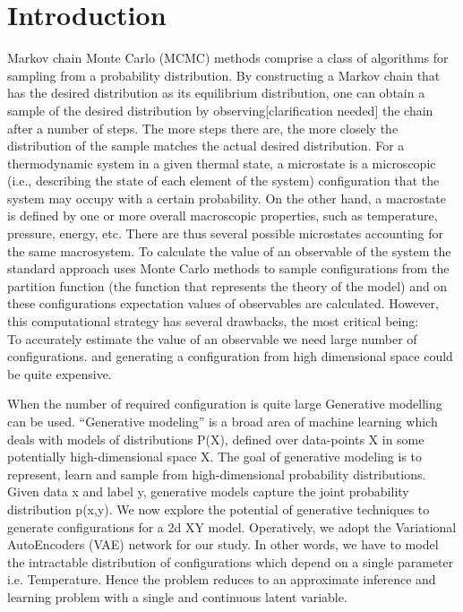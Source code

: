 \documentclass[12pt,a4paper]{article}
\begin{document}
{
\section{Introduction}
Markov chain Monte Carlo (MCMC) methods comprise a class of algorithms for sampling from a probability distribution. By constructing a Markov chain that has the desired distribution as its equilibrium distribution, one can obtain a sample of the desired distribution by observing[clarification needed] the chain after a number of steps. The more steps there are, the more closely the distribution of the sample matches the actual desired distribution. For a thermodynamic system in a given thermal state, a microstate is a microscopic (i.e., describing the state of each element of the system) configuration that the system may occupy with a certain probability. On the other hand, a macrostate is defined by one or more overall macroscopic properties, such as temperature, pressure, energy, etc. There are thus several possible microstates accounting for the same macrosystem. To calculate the value of an observable of the system the standard approach uses Monte Carlo methods to sample configurations from the partition function (the function that represents the theory of the model) and on these configurations expectation values of observables are calculated. However, this computational strategy has several drawbacks, the most critical being: \\
To accurately estimate the value of an observable we need large number of configurations. and generating a configuration from high dimensional space could be quite expensive.\par
When the number of required configuration is quite large Generative modelling can be used. “Generative modeling” is a broad area of machine learning which deals with models of distributions P(X), defined over data-points X in some potentially high-dimensional space X. The goal of generative modeling is to represent, learn and sample from high-dimensional probability distributions. Given data x and label y, generative models capture the joint probability distribution p(x,y). We now explore the potential of generative techniques to generate configurations for a 2d XY model. Operatively, we adopt the Variational AutoEncoders (VAE) network for our study.
In other words, we have to model the intractable distribution of configurations which depend on a single parameter i.e. Temperature. Hence the problem reduces to an approximate inference and learning problem with a single and continuous latent variable.

}
\end{document}
